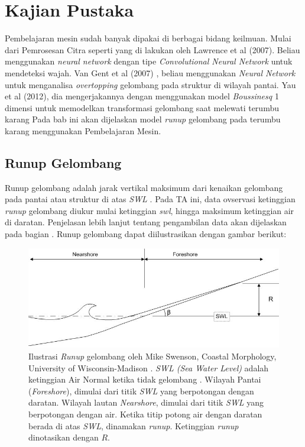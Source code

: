 \chapter{Kajian Pustaka}

Pembelajaran mesin sudah banyak dipakai di berbagai bidang keilmuan. Mulai dari Pemrosesan Citra seperti yang di lakukan oleh Lawrence et al (2007)\cite{lawrence1997face}. Beliau menggunakan \emph{neural network} dengan tipe \emph{Convolutional Neural Network} untuk mendeteksi wajah. Van Gent et al (2007) \cite{van2007neural}, beliau menggunakan \emph{Neural Network} untuk menganalisa \emph{overtopping} gelombang pada struktur di wilayah pantai. Yau et al (2012)\cite{YAO201230}, dia mengerjakannya dengan menggunakan model \emph{Boussinesq} 1 dimensi untuk memodelkan transformasi gelombang saat melewati terumbu karang Pada bab ini akan dijelaskan model \emph{runup} gelombang pada terumbu karang menggunakan Pembelajaran Mesin.

\section{Runup Gelombang}

Runup gelombang adalah jarak vertikal maksimum dari kenaikan gelombang pada pantai atau struktur di atas \emph{SWL} \cite{sorensen2005basic}. Pada TA ini, data ovservasi ketinggian \emph{runup} gelombang diukur mulai ketinggian \emph{swl}, hingga maksimum ketinggian air di daratan. Penjelasan lebih lanjut tentang pengambilan data akan dijelaskan pada bagian . Runup gelombang dapat diilustrasikan dengan gambar berikut:

\begin{figure}
    \begin{center}
        \includegraphics[scale=0.7]{./images/runup_gelombang.jpg}
    \end{center}
    \caption{Ilustrasi \emph{Runup} gelombang oleh Mike Swenson, Coastal Morphology, University of Wisconsin-Madison \cite{MikeSwenson:WaveRunup}. \emph{SWL (Sea Water Level)} adalah ketinggian Air Normal ketika tidak gelombang . Wilayah Pantai (\emph{Foreshore}), dimulai dari titik \emph{SWL} yang berpotongan dengan daratan. Wilayah lautan \emph{Nearshore}, dimulai dari titik \emph{SWL} yang berpotongan dengan air. Ketika titip potong air dengan daratan berada di atas \emph{SWL}, dinamakan \emph{runup}. Ketinggian \emph{runup} dinotasikan dengan $R$.}
\end{figure}
\FloatBarrier

